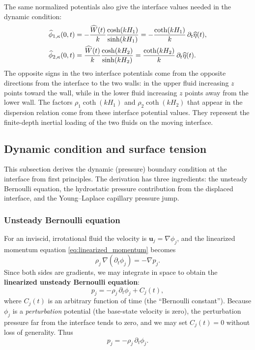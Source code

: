 \documentclass[11pt,a4paper]{article}
\begin{document}
The same normalized potentials also give the interface values needed in the dynamic condition:
\begin{align}
    \widehat{\phi}_{1,\kappa}(0,t)
    &=
    -\frac{\widehat{W}(t)}{k}
    \frac{\cosh(kH_1)}{\sinh(kH_1)}
    =
    -\frac{\coth(kH_1)}{k}\,\partial_t\widehat{\eta}(t),
    \notag\\
    \widehat{\phi}_{2,\kappa}(0,t)
    &=
    \frac{\widehat{W}(t)}{k}
    \frac{\cosh(kH_2)}{\sinh(kH_2)}
    =
    \frac{\coth(kH_2)}{k}\,\partial_t\widehat{\eta}(t).
    \label{eq:interface_potentials}
\end{align}
The opposite signs in the two interface potentials come from the opposite directions from the interface to the two walls: in the upper fluid increasing $z$ points toward the wall, while in the lower fluid increasing $z$ points away from the lower wall.  The factors $\rho_1\coth(kH_1)$ and $\rho_2\coth(kH_2)$ that appear in the dispersion relation come from these interface potential values.  They represent the finite-depth inertial loading of the two fluids on the moving interface.

\subsection{Dynamic condition and surface tension}

This subsection derives the dynamic (pressure) boundary condition at the interface from first principles.  The derivation has three ingredients: the unsteady Bernoulli equation, the hydrostatic pressure contribution from the displaced interface, and the Young--Laplace capillary pressure jump.

\subsubsection{Unsteady Bernoulli equation}

For an inviscid, irrotational fluid the velocity is $\bm{u}_j=\nabla\phi_j$, and the linearized momentum equation \eqref{eq:linearized_momentum} becomes
\begin{equation}
    \rho_j\,\nabla(\partial_t\phi_j)
    =
    -\nabla p_j.
\end{equation}
Since both sides are gradients, we may integrate in space to obtain the \textbf{linearized unsteady Bernoulli equation}:
\begin{equation}
    p_j = -\rho_j\,\partial_t\phi_j + C_j(t),
    \label{eq:unsteady_bernoulli}
\end{equation}
where $C_j(t)$ is an arbitrary function of time (the ``Bernoulli constant'').  Because $\phi_j$ is a \emph{perturbation} potential (the base-state velocity is zero), the perturbation pressure far from the interface tends to zero, and we may set $C_j(t)=0$ without loss of generality.  Thus
\begin{equation}
    \boxed{
    p_j = -\rho_j\,\partial_t\phi_j.
    }
    \label{eq:perturbation_pressure}
\end{equation}
\end{document}
